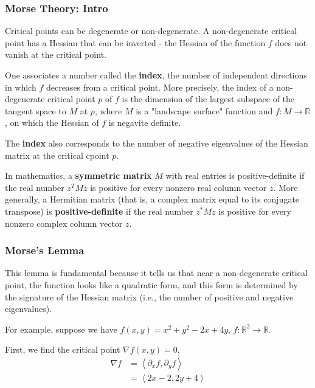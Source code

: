 \subsubsection{Morse Theory: Intro}

Critical points can be degenerate or non-degenerate.
A non-degenerate critical point has a Hessian that can be inverted - the Hessian of the function $f$ does not vanish
at the critical point.

One associates a number called the \textbf{index}, the number of independent directions in which
$f$ decreases from a critical point.
More precisely, the index of a non-degenerate critical point $p$ of $f$ is the dimension of the largest subspace
of the tangent space to $M$ at $p$, where $M$ is a "landscape surface" function and $f : M \rightarrow \mathbb{R}$,
on which the Hessian of $f$ is negavite definite.

The \textbf{index} also corresponds to the number of negative eigenvalues of the Hessian matrix at the critical cpoint $p$.


In mathematics, a \textbf{symmetric matrix} $M$ with real entries is positive-definite if the real number $z^T M z$
is positive for every nonzero real column vector $z$.
More generally, a Hermitian matrix (that is, a complex matrix equal to its conjugate transpose) is \textbf{positive-definite}
if the real number $z^* M z$ is positive for every nonzero complex column vector $z$.



\subsubsection{Morse's Lemma}

This lemma is fundamental because it tells us that near a non-degenerate critical point, the function looks
like a quadratic form, and this form is determined by the signature of the Hessian matrix
(i.e., the number of positive and negative eigenvalues).

For example, suppose we have $f(x,y) = x^2 + y^2 - 2x + 4y$, $f : \mathbb{R}^2 \rightarrow \mathbb{R}$.

First, we find the critical point $\nabla f(x,y) = 0$,
\begin{align*}
\nabla f &= \left< \partial_x f, \partial_y f \right> \\
&= \left< 2x -2, 2y + 4 \right>
\end{align*}

